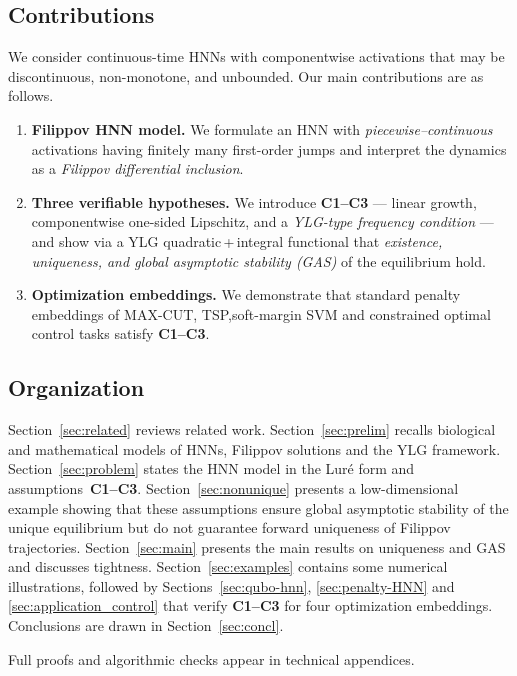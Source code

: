 \documentclass[journal]{IEEEtran}
\theoremstyle{myplain}
\begin{document}
\subsection{Contributions}\label{sec:intro:contrib}
We consider continuous-time HNNs with componentwise activations that may be discontinuous, non-monotone, and unbounded.
Our main contributions are as follows.
\begin{enumerate}[label=\textbf{(\alph*)},leftmargin=*]
\item \textbf{Filippov HNN model.} We formulate an HNN with \emph{piecewise--continuous} activations
      having finitely many first-order jumps and interpret the dynamics as a \emph{Filippov differential inclusion}.
\item \textbf{Three verifiable hypotheses.} 
      We introduce \textbf{C1--C3} --- linear growth, componentwise one-sided
      Lipschitz, and a \emph{YLG-type frequency condition} --- and show via a YLG
      quadratic\,+\,integral functional that \emph{existence, uniqueness, and global asymptotic stability (GAS)} of the equilibrium hold.
\item \textbf{Optimization embeddings.} We demonstrate that standard penalty embeddings of
      MAX-CUT, TSP,soft-margin SVM and constrained optimal control tasks satisfy \textbf{C1--C3}.
\end{enumerate}

\subsection{Organization}\label{sec:intro:org}
Section~\ref{sec:related} reviews related work.
Section~\ref{sec:prelim} recalls biological and mathematical models of HNNs,
Filippov solutions and the YLG framework.
Section~\ref{sec:problem} states the HNN model in the Lur\'{e} form and assumptions~\textbf{C1--C3}. Section~\ref{sec:nonunique} presents a low-dimensional example showing that 
these assumptions ensure global asymptotic stability of the unique equilibrium 
but do not guarantee forward uniqueness of Filippov trajectories. Section~\ref{sec:main} presents the main results on uniqueness and GAS and discusses tightness.
Section~\ref{sec:examples} contains some numerical illustrations, followed by Sections~\ref{sec:qubo-hnn}, \ref{sec:penalty-HNN} and \ref{sec:application_control} that verify \textbf{C1--C3} for four optimization embeddings.
Conclusions are drawn in Section~\ref{sec:concl}.

Full proofs and algorithmic checks appear in technical appendices.
\end{document}
